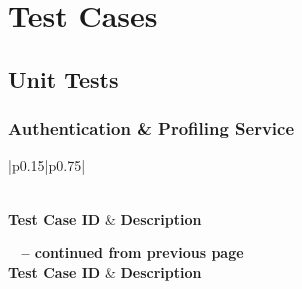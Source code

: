 \chapter{Test Cases}

\section{Unit Tests}

\subsection{Authentication \& Profiling Service}

\begin{longtable}{|p{}|p{}|}
\caption{Authentication \& Profiling Service Test Cases and Descriptions}\\
\hline
\textbf{Test Case ID} & \textbf{Description} \\
\hline
\endfirsthead

%
{{\bfseries \tablename\ \thetable{} -- continued from previous page}} \\
\hline
\textbf{Test Case ID} & \textbf{Description} \\
\hline
\endhead

\hline {} \\
\endfoot

\hline
\endlastfoot


\end{longtable}
